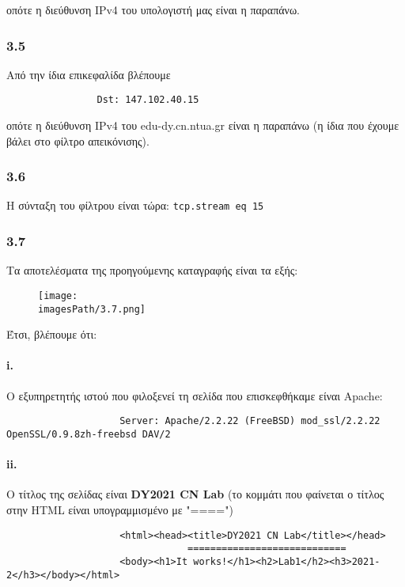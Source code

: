 		οπότε η διεύθυνση IPv4 του υπολογιστή μας είναι η παραπάνω.
		
		\subsubsection*{3.5}
			Από την ίδια επικεφαλίδα βλέπουμε
			
			\begin{verbatim}
				Dst: 147.102.40.15
			\end{verbatim} 
		
		οπότε η διεύθυνση IPv4 του edu-dy.cn.ntua.gr είναι η παραπάνω (η ίδια που έχουμε βάλει στο φίλτρο απεικόνισης).
		
		\subsubsection*{3.6}
			Η σύνταξη του φίλτρου είναι τώρα: \verb|tcp.stream eq 15|
					
		\subsubsection*{3.7}
		
			Τα αποτελέσματα της προηγούμενης καταγραφής είναι τα εξής:
		
			\begin{figure}[H]
				\texttt{[image: \\imagesPath/3.7.png]}
			\end{figure}
			
			Έτσι, βλέπουμε ότι:
			
			\paragraph{i.}
				Ο εξυπηρετητής ιστού που φιλοξενεί τη σελίδα που επισκεφθήκαμε είναι Apache:
				
				\begin{verbatim}
					Server: Apache/2.2.22 (FreeBSD) mod_ssl/2.2.22 OpenSSL/0.9.8zh-freebsd DAV/2
				\end{verbatim} 		
				
			\paragraph{ii.}
				Ο τίτλος της σελίδας είναι \textbf{DY2021 CN Lab} (το κομμάτι που φαίνεται ο τίτλος στην HTML είναι υπογραμμισμένο με "====")
				
				\begin{verbatim}
					<html><head><title>DY2021 CN Lab</title></head>
					            ============================
					<body><h1>It works!</h1><h2>Lab1</h2><h3>2021-2</h3></body></html>
				\end{verbatim}
				
